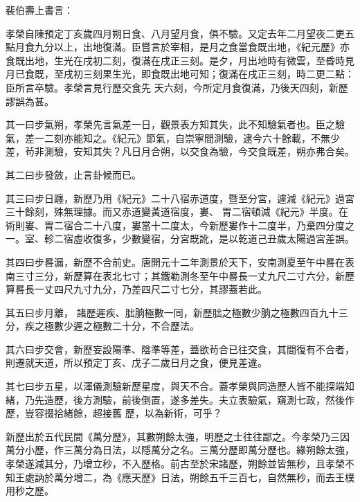 \begin{pinyinscope}
 裴伯壽上書言：



 孝榮自陳預定丁亥歲四月朔日食、八月望月食，俱不驗。又定去年二月望夜二更五點月食九分以上，出地復滿。臣嘗言於宰相，是月之食當食既出地，《紀元歷》亦食既出地，生光在戌初二刻，復滿在戌正三刻。是夕，月出地時有微雲，至昏時見月已食既，至戌初三刻果生光，即食既出地可知；復滿在戌正三刻，時二更二點：臣所言卒驗。孝榮言見行歷交食先
 天六刻，今所定月食復滿，乃後天四刻，新歷謬誤為甚。



 其一曰步氣朔，孝榮先言氣差一日，觀景表方知其失，此不知驗氣者也。臣之驗氣，差一二刻亦能知之。《紀元》節氣，自崇寧間測驗，逮今六十餘載，不無少差，茍非測驗，安知其失？凡日月合朔，以交食為驗，今交食既差，朔亦弗合矣。



 其二曰步發斂，止言卦候而已。



 其三曰步日躔，新歷乃用《紀元》二十八宿赤道度，暨至分宮，遽減《紀元》過宮三十餘刻，殊無理據。而又赤道變黃道宿度，婁、
 胃二宿頓減《紀元》半度。在術則婁、胃二宿合二十八度，婁當十二度太，今新歷婁作十二度半，乃棄四分度之一。室、軫二宿虛收復多，少數變宿，分宮既訛，是以乾道己丑歲太陽過宮差誤。



 其四曰步晷漏，新歷不合前史。唐開元十二年測景於天下，安南測夏至午中晷在表南三寸三分，新歷算在表北七寸；其鐵勒測冬至午中晷長一丈九尺二寸六分，新歷算晷長一丈四尺九寸九分，乃差四尺二寸七分，其謬蓋若此。



 其五曰步月離，
 諸歷遲疾、朏朒極數一同，新歷朏之極數少朒之極數四百九十三分，疾之極數少遲之極數二十分，不合歷法。



 其六曰步交會，新歷妄設陽準、陰準等差，蓋欲茍合已往交食，其間復有不合者，則遷就天道，所以預定丁亥、戊子二歲日月之食，便見差違。



 其七曰步五星，以渾儀測驗新歷星度，與天不合。蓋孝榮與同造歷人皆不能探端知緒，乃先造歷，後方測驗，前後倒置，遂多差失。夫立表驗氣，窺測七政，然後作歷，豈容掇拾緒餘，超接舊
 歷，以為新術，可乎？



 新歷出於五代民間《萬分歷》，其數朔餘太強，明歷之士往往鄙之。今孝榮乃三因萬分小歷，作三萬分為日法，以隱萬分之名。三萬分歷即萬分歷也。緣朔餘太強，孝榮遂減其分，乃增立秒，不入歷格。前古至於宋諸歷，朔餘並皆無秒，且孝榮不知王處訥於萬分增二，為《應天歷》日法，朔餘五千三百七，自然無秒，而去王樸用秒之歷。




\end{pinyinscope}
